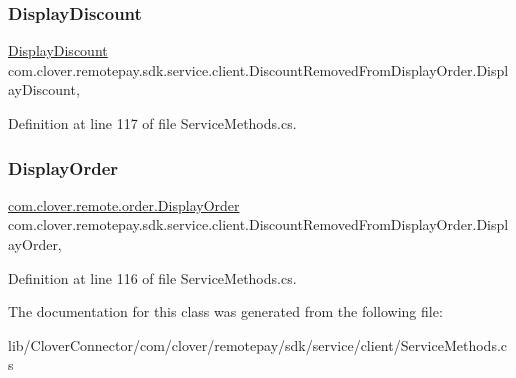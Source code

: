 \subsubsection{\texorpdfstring{Display\+Discount}{DisplayDiscount}}
{\footnotesize\ttfamily \hyperlink{classcom_1_1clover_1_1remote_1_1order_1_1_display_discount}{Display\+Discount} com.\+clover.\+remotepay.\+sdk.\+service.\+client.\+Discount\+Removed\+From\+Display\+Order.\+Display\+Discount\hspace{0.3cm}{\ttfamily [get]}, {\ttfamily [set]}}



Definition at line 117 of file Service\+Methods.\+cs.

\mbox{\label{classcom_1_1clover_1_1remotepay_1_1sdk_1_1service_1_1client_1_1_discount_removed_from_display_order_a05fdafb9aa430584e97b57e51c4d8c0d}} 
\subsubsection{\texorpdfstring{Display\+Order}{DisplayOrder}}
{\footnotesize\ttfamily \hyperlink{classcom_1_1clover_1_1remote_1_1order_1_1_display_order}{com.\+clover.\+remote.\+order.\+Display\+Order} com.\+clover.\+remotepay.\+sdk.\+service.\+client.\+Discount\+Removed\+From\+Display\+Order.\+Display\+Order\hspace{0.3cm}{\ttfamily [get]}, {\ttfamily [set]}}



Definition at line 116 of file Service\+Methods.\+cs.



The documentation for this class was generated from the following file\+:\begin{DoxyCompactItemize}
\item 
lib/\+Clover\+Connector/com/clover/remotepay/sdk/service/client/Service\+Methods.\+cs\end{DoxyCompactItemize}
